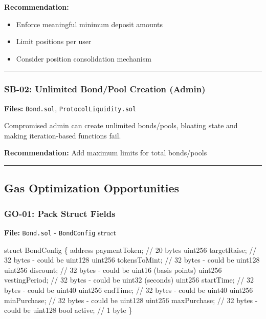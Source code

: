 \documentclass[
]{article}
\newenvironment{Shaded}{}{}
\newcommand{\NormalTok}[1]{#1}
\providecommand{\tightlist}{%
  \setlength{\itemsep}{0pt}\setlength{\parskip}{0pt}}
\begin{document}
\textbf{Recommendation:}

\begin{itemize}
\tightlist
\item
  Enforce meaningful minimum deposit amounts
\item
  Limit positions per user
\item
  Consider position consolidation mechanism
\end{itemize}

\begin{center}\rule{0.5\linewidth}{0.5pt}\end{center}

\subsubsection{SB-02: Unlimited Bond/Pool Creation
(Admin)}\label{sb-02-unlimited-bondpool-creation-admin}

\textbf{Files:} \texttt{Bond.sol}, \texttt{ProtocolLiquidity.sol}

Compromised admin can create unlimited bonds/pools, bloating state and
making iteration-based functions fail.

\textbf{Recommendation:} Add maximum limits for total bonds/pools

\begin{center}\rule{0.5\linewidth}{0.5pt}\end{center}

\subsection{Gas Optimization
Opportunities}\label{gas-optimization-opportunities}

\subsubsection{GO-01: Pack Struct
Fields}\label{go-01-pack-struct-fields}

\textbf{File:} \texttt{Bond.sol} - \texttt{BondConfig} struct

\begin{Shaded}
\begin{Highlighting}[]
\NormalTok{struct BondConfig \{}
\NormalTok{    address paymentToken;      // 20 bytes}
\NormalTok{    uint256 targetRaise;       // 32 bytes {-} could be uint128}
\NormalTok{    uint256 tokensToMint;      // 32 bytes {-} could be uint128}
\NormalTok{    uint256 discount;          // 32 bytes {-} could be uint16 (basis points)}
\NormalTok{    uint256 vestingPeriod;     // 32 bytes {-} could be uint32 (seconds)}
\NormalTok{    uint256 startTime;         // 32 bytes {-} could be uint40}
\NormalTok{    uint256 endTime;           // 32 bytes {-} could be uint40}
\NormalTok{    uint256 minPurchase;       // 32 bytes {-} could be uint128}
\NormalTok{    uint256 maxPurchase;       // 32 bytes {-} could be uint128}
\NormalTok{    bool active;               // 1 byte}
\NormalTok{\}}
\end{Highlighting}
\end{Shaded}
\end{document}
